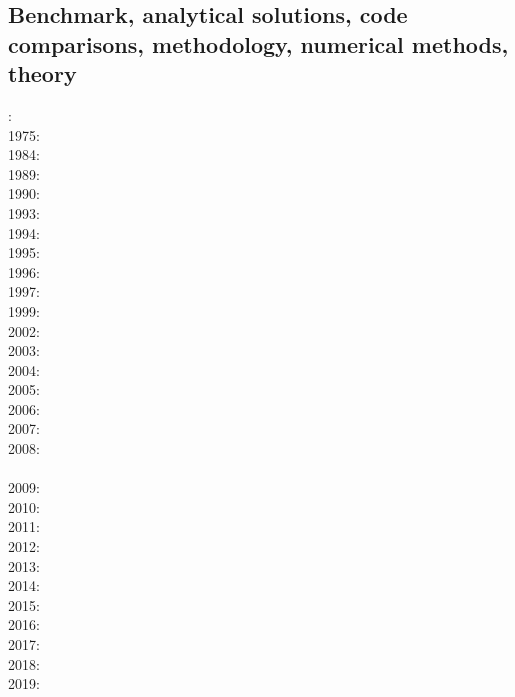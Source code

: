 \subsection*{Benchmark, analytical solutions, code comparisons, methodology, numerical methods, theory}

: \cite{hiac74}\\
1975: \cite{waki75a}\cite{waki75b}\\
1984: \cite{yusa84}\\
1989: \cite{blbc89}\\
1990: \cite{trab90}\\
1993: \cite{leka93}\\
1994: \cite{brsa94}\\
1995: \cite{brsa95}\cite{moso95}\cite{full95}\\
1996: \cite{zhon96}\cite{mozg96}\\
1997: \cite{rist97}\\
1999: \cite{lind99}\cite{bird99}\\
2002: \cite{mudm02}\\
2003: \cite{taki03}\cite{modm03}\cite{geyu03}\cite{geyu03b}\cite{taxi03}\\
2004: \cite{kaps04}\cite{kasa04}\cite{kaks08}\cite{mumc04}\\
2005: \cite{mure05}\\
2006: \cite{kapo06}\cite{more06}\cite{omma06}\cite{mudm06}\\
2007: \cite{toma07}\cite{chcc07}\cite{kabe07}\cite{kaks07}\cite{moql07}\cite{geyu07}\\
2008: \cite{zhmt08}\cite{deka08}\cite{trub08}\cite{krdp08}\cite{mamo08}\cite{gepd98}\cite{vack08}\\
      \cite{heta08}\cite{brtf08}\\
2009: \cite{king09}\cite{geum09}\cite{vemm09}\cite{qurj09}\\
2010: \cite{kaus10}\cite{kamm10}\cite{egat10}\cite{kilv10}\\
2011: \cite{dumg11}\cite{uibb11}\cite{hegc11}\cite{muso11}\\
2012: \cite{crsg12}\cite{chgv12}\cite{krwd12}\cite{may12}\cite{gerb12}\cite{asmo12}\\
2013: \cite{chtl13}\cite{kemk13}\cite{gemd13}\\
2014: \cite{thmk14}\cite{mabl14}\cite{lopp14}\\
2015: \cite{lelk15}\cite{rumi15}\cite{chpe15}\cite{mabl15}\\
2016: \cite{dumy16}\cite{blmp16}\\
2017: \cite{robh17}\cite{wisv17}\cite{majc17}\\
2018: \cite{memm18}\\
2019: \cite{clhe19}\cite{liki19}\cite{demh19}\cite{galb19}\cite{frtv19}

